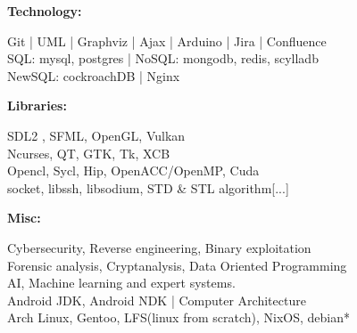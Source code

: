 \documentclass[a4paper,10pt]{article}
\begin{document}
\begin{adjustbox}{valign=t}
\begin{minipage}{0.6\textwidth}
\begin{description}
\begin{spacing}{0.85}
\item{\textbf{Technology:}}

    Git | UML | Graphviz | Ajax | Arduino | Jira | Confluence\\
    SQL: mysql, postgres | NoSQL: mongodb, redis, scylladb\\
    NewSQL: cockroachDB | Nginx

\item{\textbf{Libraries:}}

    SDL2 , SFML, OpenGL, Vulkan\\
    Ncurses, QT, GTK, Tk, XCB\\
    Opencl, Sycl, Hip, OpenACC/OpenMP, Cuda\\
    socket, libssh, libsodium, STD \& STL algorithm{[...]}

\item{\textbf{Misc:}}

    Cybersecurity, Reverse engineering, Binary exploitation\\
    Forensic analysis, Cryptanalysis, Data Oriented Programming\\
    AI, Machine learning and expert systems.\\
    Android JDK, Android NDK | Computer Architecture\\
    Arch Linux, Gentoo, LFS(linux from scratch), NixOS, debian*

\vspace{-2.2\baselineskip}
\end{spacing}
\end{description}







\end{minipage}
\end{adjustbox}
\end{document}
